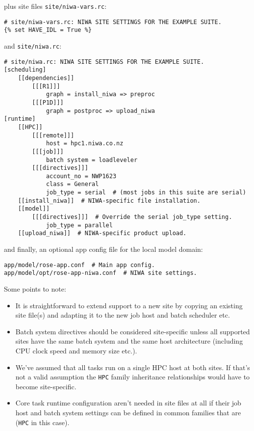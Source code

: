 plus site files \lstinline=site/niwa-vars.rc=:

\lstset{language=suiterc}
\begin{lstlisting}
# site/niwa-vars.rc: NIWA SITE SETTINGS FOR THE EXAMPLE SUITE.
{% set HAVE_IDL = True %}
\end{lstlisting}

and \lstinline=site/niwa.rc=:

\lstset{language=suiterc}
\begin{lstlisting}
# site/niwa.rc: NIWA SITE SETTINGS FOR THE EXAMPLE SUITE.
[scheduling]
    [[dependencies]]
        [[[R1]]]
            graph = install_niwa => preproc
        [[[P1D]]]
            graph = postproc => upload_niwa
[runtime]
    [[HPC]]
        [[[remote]]]
            host = hpc1.niwa.co.nz
        [[[job]]]
            batch system = loadleveler
        [[[directives]]]
            account_no = NWP1623
            class = General
            job_type = serial  # (most jobs in this suite are serial)
    [[install_niwa]]  # NIWA-specific file installation.
    [[model]]
        [[[directives]]]  # Override the serial job_type setting.
            job_type = parallel
    [[upload_niwa]]  # NIWA-specific product upload.
\end{lstlisting}

and finally, an optional app config file for the local model domain:

\lstset{language=bash}
\begin{lstlisting}
app/model/rose-app.conf  # Main app config.
app/model/opt/rose-app-niwa.conf  # NIWA site settings.
\end{lstlisting}

Some points to note:

\begin{itemize}
  \item It is straightforward to extend support to a new site by copying an
    existing site file(s) and adapting it to the new job host and batch
    scheduler etc.

  \item Batch system directives should be considered site-specific unless
    all supported sites have the same batch system and the same host
    architecture (including CPU clock speed and memory size etc.).

  \item We've assumed that all tasks run on a single HPC host at both
    sites. If that's not a valid assumption the \lstinline=HPC= family
    inheritance relationships would have to become site-specific.

  \item Core task runtime configuration aren't needed in site files at all
    if their job host and batch system settings can be defined in common
    families that are (\lstinline=HPC= in this case).
\end{itemize}


